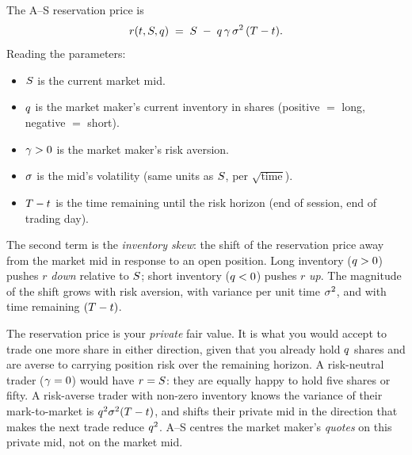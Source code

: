 \begin{keyfactbox}
The A--S reservation price is
\[
  r(t, S, q) \;=\; S \;-\; q \, \gamma \, \sigma^2 \,(T - t).
\]
Reading the parameters:
\begin{itemize}
  \item $S$ is the current market mid.
  \item $q$ is the market maker's current inventory in shares
  (positive $=$ long, negative $=$ short).
  \item $\gamma > 0$ is the market maker's risk aversion.
  \item $\sigma$ is the mid's volatility (same units as $S$,
  per $\sqrt{\text{time}}$).
  \item $T - t$ is the time remaining until the risk horizon
  (end of session, end of trading day).
\end{itemize}
The second term is the \emph{inventory skew}: the shift of the
reservation price away from the market mid in response to an
open position. Long inventory ($q > 0$) pushes $r$ \emph{down}
relative to $S$; short inventory ($q < 0$) pushes $r$
\emph{up}. The magnitude of the shift grows with risk aversion,
with variance per unit time $\sigma^2$, and with time remaining
$(T - t)$.
\end{keyfactbox}

\begin{intuitionbox}
The reservation price is your \emph{private} fair value. It is
what you would accept to trade one more share in either
direction, given that you already hold $q$ shares and are
averse to carrying position risk over the remaining horizon. A
risk-neutral trader ($\gamma = 0$) would have $r = S$: they
are equally happy to hold five shares or fifty. A risk-averse
trader with non-zero inventory knows the variance of their
mark-to-market is $q^2 \sigma^2 (T - t)$, and shifts
their private mid in the direction that makes the next trade
reduce $q^2$. A--S centres the market maker's \emph{quotes}
on this private mid, not on the market mid.
\end{intuitionbox}


